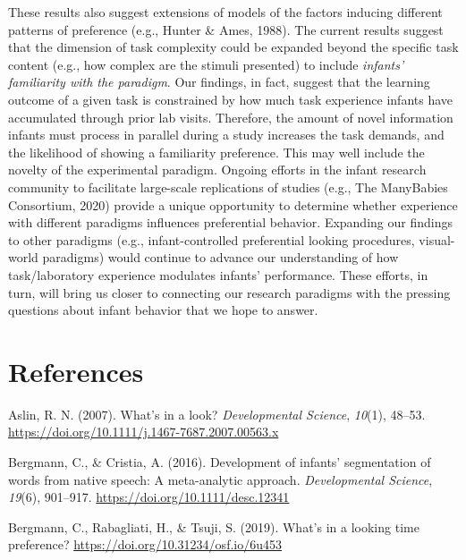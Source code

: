 \documentclass[english,man,man,floatsintext]{apa6}
\begin{document}
These results also suggest extensions of models of the factors inducing different patterns of preference (e.g., Hunter \& Ames, 1988). The current results suggest that the dimension of task complexity could be expanded beyond the specific task content (e.g., how complex are the stimuli presented) to include \emph{infants' familiarity with the paradigm}. Our findings, in fact, suggest that the learning outcome of a given task is constrained by how much task experience infants have accumulated through prior lab visits. Therefore, the amount of novel information infants must process in parallel during a study increases the task demands, and the likelihood of showing a familiarity preference. This may well include the novelty of the experimental paradigm. Ongoing efforts in the infant research community to facilitate large-scale replications of studies (e.g., The ManyBabies Consortium, 2020) provide a unique opportunity to determine whether experience with different paradigms influences preferential behavior. Expanding our findings to other paradigms (e.g., infant-controlled preferential looking procedures, visual-world paradigms) would continue to advance our understanding of how task/laboratory experience modulates infants' performance. These efforts, in turn, will bring us closer to connecting our research paradigms with the pressing questions about infant behavior that we hope to answer.

\newpage

\hypertarget{references}{%
\section*{References}\label{references}}

\begingroup
\setlength{\parindent}{-0.5in}
\setlength{\leftskip}{0.5in}

\hypertarget{refs}{}
\leavevmode\hypertarget{ref-aslin2007}{}%
Aslin, R. N. (2007). What's in a look? \emph{Developmental Science}, \emph{10}(1), 48--53. \url{https://doi.org/10.1111/j.1467-7687.2007.00563.x}

\leavevmode\hypertarget{ref-bergmann2016}{}%
Bergmann, C., \& Cristia, A. (2016). Development of infants' segmentation of words from native speech: A meta-analytic approach. \emph{Developmental Science}, \emph{19}(6), 901--917. \url{https://doi.org/10.1111/desc.12341}

\leavevmode\hypertarget{ref-bergmann2019}{}%
Bergmann, C., Rabagliati, H., \& Tsuji, S. (2019). What's in a looking time preference? \url{https://doi.org/10.31234/osf.io/6u453}
\end{document}
